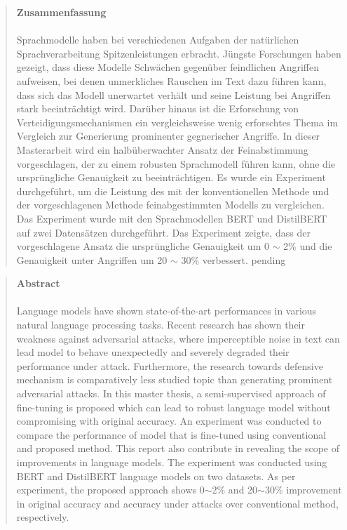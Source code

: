 
\pagestyle{plain}

\begin{quote}
\textbf{\Large Zusammenfassung}\\\\
Sprachmodelle haben bei verschiedenen Aufgaben der natürlichen Sprachverarbeitung Spitzenleistungen erbracht. Jüngste Forschungen haben gezeigt, dass diese Modelle Schwächen gegenüber feindlichen Angriffen aufweisen, bei denen unmerkliches Rauschen im Text dazu führen kann, dass sich das Modell unerwartet verhält und seine Leistung bei Angriffen stark beeinträchtigt wird. Darüber hinaus ist die Erforschung von Verteidigungsmechanismen ein vergleichsweise wenig erforschtes Thema im Vergleich zur Generierung prominenter gegnerischer Angriffe. In dieser Masterarbeit wird ein halbüberwachter Ansatz der Feinabstimmung vorgeschlagen, der zu einem robusten Sprachmodell führen kann, ohne die ursprüngliche Genauigkeit zu beeinträchtigen. Es wurde ein Experiment durchgeführt, um die Leistung des mit der konventionellen Methode und der vorgeschlagenen Methode feinabgestimmten Modells zu vergleichen. Das Experiment wurde mit den Sprachmodellen BERT und DistilBERT auf zwei Datensätzen durchgeführt.  Das Experiment zeigte, dass der vorgeschlagene Ansatz die ursprüngliche Genauigkeit um 0 $\sim$ 2\% und die Genauigkeit unter Angriffen um 20 $\sim$ 30\% verbessert.
pending
\end{quote}

\newpage

\begin{quote}
	\textbf{\Large Abstract}\\\\
Language models have shown state-of-the-art performances in various natural language  processing tasks. Recent research has shown their weakness against adversarial attacks, where imperceptible noise in text can lead model to behave unexpectedly and severely degraded their performance under attack. Furthermore, the research towards defensive mechanism is comparatively less studied topic than generating prominent adversarial attacks. In this master thesis, a semi-supervised approach of fine-tuning is proposed which can lead to robust language model without compromising with original accuracy. An experiment was conducted to compare the performance of model  that is fine-tuned using conventional and proposed method. This report also contribute in revealing the scope of improvements in language models.
The experiment was conducted using BERT and DistilBERT language models on two datasets.  As per experiment, the proposed approach shows  0$\sim$2\% and  20$\sim$30\%  improvement in original accuracy and  accuracy under attacks over conventional method, respectively. 

\end{quote}
